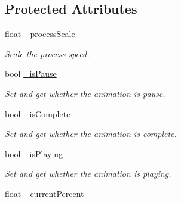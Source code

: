 \subsection*{Protected Attributes}
\begin{DoxyCompactItemize}
\item 
\mbox{\label{classcocostudio_1_1ProcessBase_ade989d2c02e52aa9b6aaa6e21bf360ea}} 
float \hyperlink{classcocostudio_1_1ProcessBase_ade989d2c02e52aa9b6aaa6e21bf360ea}{\+\_\+process\+Scale}
\begin{DoxyCompactList}\small\item\em Scale the process speed. \end{DoxyCompactList}\item 
\mbox{\label{classcocostudio_1_1ProcessBase_a9e4f09400fede31158ea05d4ef463f97}} 
bool \hyperlink{classcocostudio_1_1ProcessBase_a9e4f09400fede31158ea05d4ef463f97}{\+\_\+is\+Pause}
\begin{DoxyCompactList}\small\item\em Set and get whether the animation is pause. \end{DoxyCompactList}\item 
\mbox{\label{classcocostudio_1_1ProcessBase_ad13be8a4aa247edc9e78d9161b5ae359}} 
bool \hyperlink{classcocostudio_1_1ProcessBase_ad13be8a4aa247edc9e78d9161b5ae359}{\+\_\+is\+Complete}
\begin{DoxyCompactList}\small\item\em Set and get whether the animation is complete. \end{DoxyCompactList}\item 
\mbox{\label{classcocostudio_1_1ProcessBase_a7d411756c8839b1d3f486a215ffce93a}} 
bool \hyperlink{classcocostudio_1_1ProcessBase_a7d411756c8839b1d3f486a215ffce93a}{\+\_\+is\+Playing}
\begin{DoxyCompactList}\small\item\em Set and get whether the animation is playing. \end{DoxyCompactList}\item 
\mbox{\label{classcocostudio_1_1ProcessBase_aa000cc879def0e7b6f047619d1f66a4c}} 
float \hyperlink{classcocostudio_1_1ProcessBase_aa000cc879def0e7b6f047619d1f66a4c}{\+\_\+current\+Percent}

\end{DoxyCompactItemize}
